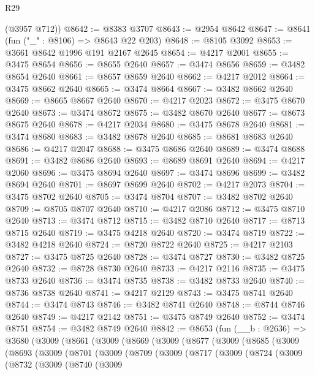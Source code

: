\begin{lexlean}{R29}
\begin{coremodule}
      (@3957 @712))
@8642 := @8383 @3707
@8643 := @2954 @8642
@8647 := @8641 (fun ("_" : @8106) => @8643 @22 @203)
@8648 := @8105 @3092
@8653 := @3661 @8642 @1996 @191 @2167 @2645
@8654 := @4217 @2001
@8655 := @3475 @8654
@8656 := @8655 @2640
@8657 := @3474 @8656
@8659 := @3482 @8654 @2640
@8661 := @8657 @8659 @2640
@8662 := @4217 @2012
@8664 := @3475 @8662 @2640
@8665 := @3474 @8664
@8667 := @3482 @8662 @2640
@8669 := @8665 @8667 @2640
@8670 := @4217 @2023
@8672 := @3475 @8670 @2640
@8673 := @3474 @8672
@8675 := @3482 @8670 @2640
@8677 := @8673 @8675 @2640
@8678 := @4217 @2034
@8680 := @3475 @8678 @2640
@8681 := @3474 @8680
@8683 := @3482 @8678 @2640
@8685 := @8681 @8683 @2640
@8686 := @4217 @2047
@8688 := @3475 @8686 @2640
@8689 := @3474 @8688
@8691 := @3482 @8686 @2640
@8693 := @8689 @8691 @2640
@8694 := @4217 @2060
@8696 := @3475 @8694 @2640
@8697 := @3474 @8696
@8699 := @3482 @8694 @2640
@8701 := @8697 @8699 @2640
@8702 := @4217 @2073
@8704 := @3475 @8702 @2640
@8705 := @3474 @8704
@8707 := @3482 @8702 @2640
@8709 := @8705 @8707 @2640
@8710 := @4217 @2086
@8712 := @3475 @8710 @2640
@8713 := @3474 @8712
@8715 := @3482 @8710 @2640
@8717 := @8713 @8715 @2640
@8719 := @3475 @4218 @2640
@8720 := @3474 @8719
@8722 := @3482 @4218 @2640
@8724 := @8720 @8722 @2640
@8725 := @4217 @2103
@8727 := @3475 @8725 @2640
@8728 := @3474 @8727
@8730 := @3482 @8725 @2640
@8732 := @8728 @8730 @2640
@8733 := @4217 @2116
@8735 := @3475 @8733 @2640
@8736 := @3474 @8735
@8738 := @3482 @8733 @2640
@8740 := @8736 @8738 @2640
@8741 := @4217 @2129
@8743 := @3475 @8741 @2640
@8744 := @3474 @8743
@8746 := @3482 @8741 @2640
@8748 := @8744 @8746 @2640
@8749 := @4217 @2142
@8751 := @3475 @8749 @2640
@8752 := @3474 @8751
@8754 := @3482 @8749 @2640
@8842 := @8653
    (fun (__b : @2636) =>
    @3680
      (@3009
        (@8661
          (@3009
            (@8669
              (@3009
                (@8677
                  (@3009
                    (@8685
                      (@3009
                        (@8693
                          (@3009
                            (@8701
                              (@3009
                                (@8709
                                  (@3009
                                    (@8717
                                      (@3009
                                        (@8724
                                          (@3009
                                            (@8732
                                              (@3009
                                                (@8740
                                                  (@3009

\end{coremodule}
\end{lexlean}
